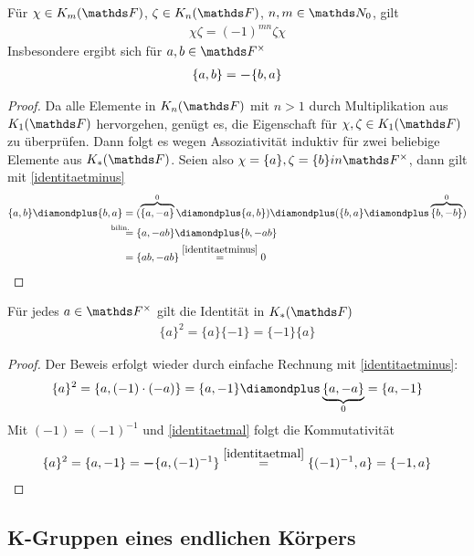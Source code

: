 \documentclass[ngerman,fontsize=11pt, paper=a4, parskip=half, titlepage=true, toc=bib]{scrartcl}
\begin{document}
\begin{Lem}\label{identitaetmal}
  Für $\chi\in\K_m(\F)$, $\zeta\in\K_n(\F)$, $n,m\in\N_0$, gilt
  \begin{gather*}
    \chi\zeta=(-1)^{mn}\zeta\chi
  \end{gather*}
  Insbesondere ergibt sich für $a,b\in \Fx$
  \begin{gather*}
    \{a,b\}= \boldsymbol -\{b,a\}
  \end{gather*}
  \begin{proof}
    Da alle Elemente in $\KnF$ mit $n>1$ durch Multiplikation aus
    $\KoF$ hervorgehen, genügt es, die Eigenschaft für
    $\chi,\zeta\in\KoF$ zu überprüfen. Dann folgt es wegen
    Assoziativität induktiv für zwei beliebige Elemente aus $\KF$.
    Seien also $\chi=\{a\},\zeta=\{b\}in\Fx$, dann gilt mit \ref{identitaetminus}
    \begin{align*}
      \{a,b\}\p \{b,a\} 
      &= (\overbrace{\{a,-a\}}^{0} \p \{a,b\} )
        \p (\{b,a\} \p \overbrace{\{b,-b\}}^{0} ) \\
      &\overset{\mathllap{\text{bilin.}}}{=} \{ a,-ab \} \p \{b, -ab\}\\
      &= \{ ab, -ab\} \overset{\ref{identitaetminus}}{=} 0
    \end{align*}
  \end{proof}
\end{Lem}

\begin{Lem}\label{identitaetquadrat}
  Für jedes $a\in \Fx$ gilt die Identität in $\KF$
  \begin{gather*}
    \{a\}^2 = \{a\}\{-1\} = \{-1\}\{a\}
  \end{gather*}
  \begin{proof}
    Der Beweis erfolgt wieder durch einfache Rechnung mit
    \ref{identitaetminus}:
    \begin{gather*}
      \{a\}^2 = \{a,(-1)\cdot (-a)\} 
      = \{a,-1\}\p\underbrace{\{a,-a\}}_{0} = \{a,-1\}
    \end{gather*}
    Mit $(-1)=(-1)^{-1}$ und \ref{identitaetmal} folgt die Kommutativität
    \begin{gather*}
      \{a\}^2 = \{a,-1\}= \boldsymbol -\{a,(-1)^{-1}\} 
      \overset{\ref{identitaetmal}}{=} \{(-1)^{-1},a\} = \{-1,a\}
    \end{gather*}
  \end{proof}
\end{Lem}


\subsection{K-Gruppen eines endlichen Körpers}
\end{document}
